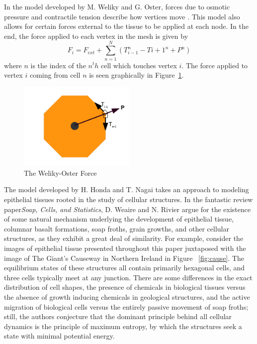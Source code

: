 {In the model developed by M. Weliky and G. Oster, forces due to osmotic pressure and contractile tension describe how vertices move \cite{WO}. This model also allows for certain forces external to the tissue to be applied at each node. In the end, the force applied to each vertex in the mesh is given by
\begin{equation*}
F_i = F_{ext}+\sum\limits_{n=1}^N(T_{i-1}^n - T{i+1}^n + P^n)
\end{equation*}
where $n$ is the index of the $n^th$ cell which touches vertex $i$. The force applied to vertex $i$ coming from cell $n$  is seen graphically in Figure~\ref{fig:WO}.
\begin{figure}[h]
\centering
\includegraphics[width=0.5\textwidth]{../diagrams/welikyoster.png}
\caption{The Weliky-Oster Force}
\label{fig:WO}
\end{figure}

The model developed by H. Honda and T. Nagai takes an approach to modeling epithelial tissues rooted in the study of cellular structures.  In the fantastic review paper\emph{Soap, Cells, and Statistics}, D. Weaire and N. Rivier argue for the existence of some natural mechanism underlying the development of epithelial tissue, columnar basalt formations, soap froths, grain growths, and other cellular structures, as they exhibit a great deal of similarity. For example, consider the images of epithelial tissue presented throughout this paper juxtaposed with the image of The Giant's Causeway in Northern Ireland in Figure ~\ref{fig:cause}. The equilibrium states of these structures all contain primarily hexagonal cells, and three cells typically meet at any junction. There are some differences in the exact distribution of cell shapes, the presence of chemicals in biological tissues versus the absence of growth inducing chemicals in geological structures, and the active migration of biological cells versus the entirely passive movement of soap froths; still, the authors conjecture that the dominant principle behind all cellular dynamics is the principle of maximum entropy, by which the structures seek a state with minimal potential energy.

}
